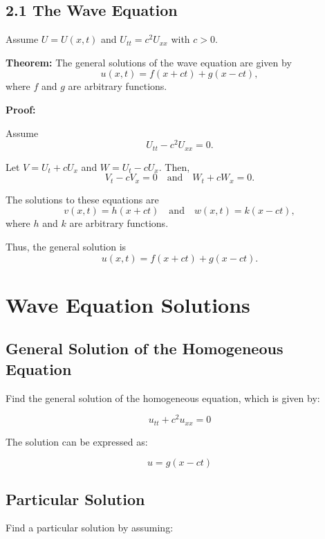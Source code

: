 \documentclass[11pt]{article}
\begin{document}
\subsection*{2.1 The Wave Equation}

Assume \( U = U(x, t) \) and \( U_{tt} = c^2 U_{xx} \) with \( c > 0 \).

\textbf{Theorem:} The general solutions of the wave equation are given by
\[
u(x, t) = f(x + ct) + g(x - ct),
\]
where \( f \) and \( g \) are arbitrary functions.

\textbf{Proof:}

Assume
\[
U_{tt} - c^2 U_{xx} = 0.
\]

Let \( V = U_t + c U_x \) and \( W = U_t - c U_x \). Then,
\[
V_t - c V_x = 0 \quad \text{and} \quad W_t + c W_x = 0.
\]

The solutions to these equations are
\[
v(x, t) = h(x + ct) \quad \text{and} \quad w(x, t) = k(x - ct),
\]
where \( h \) and \( k \) are arbitrary functions.

Thus, the general solution is
\[
u(x, t) = f(x + ct) + g(x - ct).
\]





\section*{Wave Equation Solutions}

\subsection*{General Solution of the Homogeneous Equation}

Find the general solution of the homogeneous equation, which is given by:

\begin{equation}
    u_{tt} + c^2 u_{xx} = 0
\end{equation}

The solution can be expressed as:

\begin{equation}
    u = g(x - ct)
\end{equation}

\subsection*{Particular Solution}

Find a particular solution by assuming:
\end{document}
